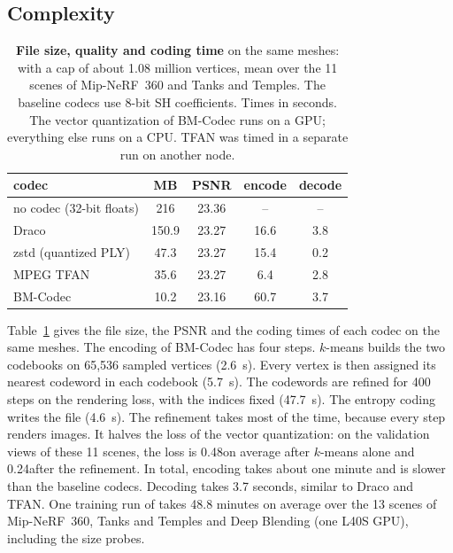\subsection{Complexity}
\label{sec:time}

\begin{table}[t]\centering\footnotesize
\caption{\textbf{File size, quality and coding time} on the same meshes: \MSc with a cap of about 1.08 million vertices, mean over the 11 scenes of Mip-NeRF~360 and Tanks and Temples. The baseline codecs use 8-bit SH coefficients. Times in seconds. The vector quantization of BM-Codec runs on a GPU; everything else runs on a CPU. TFAN was timed in a separate run on another node.}
\label{tab:time}
\setlength{\tabcolsep}{3.6pt}
\begin{tabular}{@{}lcccc@{}}
\toprule
codec & MB & PSNR & encode & decode \\
\midrule
no codec (32-bit floats) & 216 & 23.36 & -- & -- \\
Draco & 150.9 & 23.27 & 16.6 & 3.8 \\
zstd (quantized PLY) & 47.3 & 23.27 & 15.4 & 0.2 \\
MPEG TFAN & 35.6 & 23.27 & 6.4 & 2.8 \\
\midrule
BM-Codec & 10.2 & 23.16 & 60.7 & 3.7 \\
\bottomrule
\end{tabular}
\end{table}

Table~\ref{tab:time} gives the file size, the PSNR and the coding times of each codec on the same meshes. The encoding of BM-Codec has four steps. $k$-means builds the two codebooks on 65{,}536 sampled vertices (2.6~s). Every vertex is then assigned its nearest codeword in each codebook (5.7~s). The codewords are refined for 400 steps on the rendering loss, with the indices fixed (47.7~s). The entropy coding writes the file (4.6~s). The refinement takes most of the time, because every step renders images. It halves the loss of the vector quantization: on the validation views of these 11 scenes, the loss is 0.48\dB on average after $k$-means alone and 0.24\dB after the refinement. In total, encoding takes about one minute and is slower than the baseline codecs. Decoding takes 3.7 seconds, similar to Draco and TFAN. One training run of \BM takes 48.8 minutes on average over the 13 scenes of Mip-NeRF~360, Tanks and Temples and Deep Blending (one L40S GPU), including the size probes.

